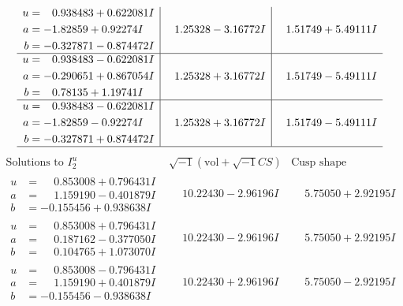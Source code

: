 \documentclass[1p]{elsarticle_modified}
\theoremstyle{definition}
\newcommand{\I}{\sqrt{-1}}
\begin{document}
$$\begin{array}{c|c|c}
\begin{aligned}
u &= \phantom{-}0.938483 + 0.622081 I \\
a &= -1.82859 + 0.92274 I \\
b &= -0.327871 - 0.874472 I\end{aligned}
 & \phantom{-}1.25328 - 3.16772 I & \phantom{-}1.51749 + 5.49111 I \\ \hline\begin{aligned}
u &= \phantom{-}0.938483 - 0.622081 I \\
a &= -0.290651 + 0.867054 I \\
b &= \phantom{-}0.78135 + 1.19741 I\end{aligned}
 & \phantom{-}1.25328 + 3.16772 I & \phantom{-}1.51749 - 5.49111 I \\ \hline\begin{aligned}
u &= \phantom{-}0.938483 - 0.622081 I \\
a &= -1.82859 - 0.92274 I \\
b &= -0.327871 + 0.874472 I\end{aligned}
 & \phantom{-}1.25328 + 3.16772 I & \phantom{-}1.51749 - 5.49111 I\\
 \hline 
 \end{array}$$\newpage$$\begin{array}{c|c|c}  
\text{Solutions to }I^u_{2}& \I (\text{vol} + \sqrt{-1}CS) & \text{Cusp shape}\\
 \hline 
\begin{aligned}
u &= \phantom{-}0.853008 + 0.796431 I \\
a &= \phantom{-}1.159190 - 0.401879 I \\
b &= -0.155456 + 0.938638 I\end{aligned}
 & \phantom{-}10.22430 - 2.96196 I & \phantom{-}5.75050 + 2.92195 I \\ \hline\begin{aligned}
u &= \phantom{-}0.853008 + 0.796431 I \\
a &= \phantom{-}0.187162 - 0.377050 I \\
b &= \phantom{-}0.104765 + 1.073070 I\end{aligned}
 & \phantom{-}10.22430 - 2.96196 I & \phantom{-}5.75050 + 2.92195 I \\ \hline\begin{aligned}
u &= \phantom{-}0.853008 - 0.796431 I \\
a &= \phantom{-}1.159190 + 0.401879 I \\
b &= -0.155456 - 0.938638 I\end{aligned}
 & \phantom{-}10.22430 + 2.96196 I & \phantom{-}5.75050 - 2.92195 I \\ \hline\begin{aligned}

\end{aligned}
\end{array}$$
\end{document}
